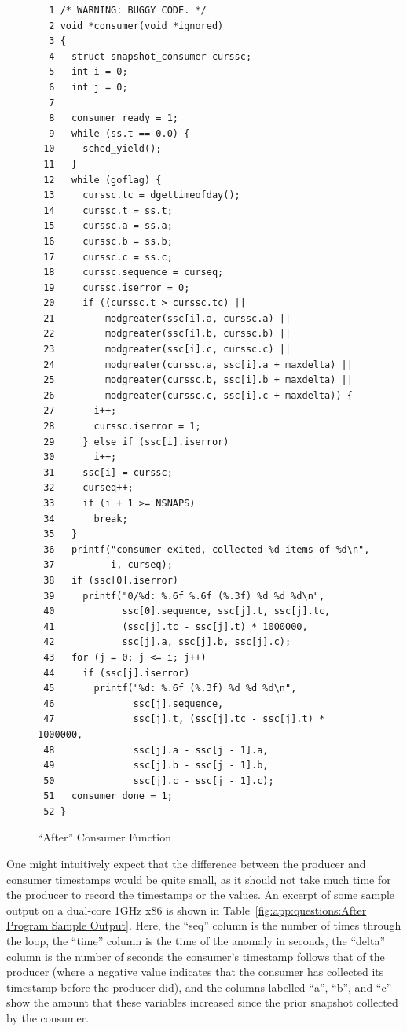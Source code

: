 \begin{figure}[htbp]
{ \scriptsize
\begin{verbatim}
  1 /* WARNING: BUGGY CODE. */
  2 void *consumer(void *ignored)
  3 {
  4   struct snapshot_consumer curssc;
  5   int i = 0;
  6   int j = 0;
  7 
  8   consumer_ready = 1;
  9   while (ss.t == 0.0) {
 10     sched_yield();
 11   }
 12   while (goflag) {
 13     curssc.tc = dgettimeofday();
 14     curssc.t = ss.t;
 15     curssc.a = ss.a;
 16     curssc.b = ss.b;
 17     curssc.c = ss.c;
 18     curssc.sequence = curseq;
 19     curssc.iserror = 0;
 20     if ((curssc.t > curssc.tc) ||
 21         modgreater(ssc[i].a, curssc.a) ||
 22         modgreater(ssc[i].b, curssc.b) ||
 23         modgreater(ssc[i].c, curssc.c) ||
 24         modgreater(curssc.a, ssc[i].a + maxdelta) ||
 25         modgreater(curssc.b, ssc[i].b + maxdelta) ||
 26         modgreater(curssc.c, ssc[i].c + maxdelta)) {
 27       i++;
 28       curssc.iserror = 1;
 29     } else if (ssc[i].iserror)
 30       i++;
 31     ssc[i] = curssc;
 32     curseq++;
 33     if (i + 1 >= NSNAPS)
 34       break;
 35   }
 36   printf("consumer exited, collected %d items of %d\n",
 37          i, curseq);
 38   if (ssc[0].iserror)
 39     printf("0/%d: %.6f %.6f (%.3f) %d %d %d\n",
 40            ssc[0].sequence, ssc[j].t, ssc[j].tc,
 41            (ssc[j].tc - ssc[j].t) * 1000000,
 42            ssc[j].a, ssc[j].b, ssc[j].c);
 43   for (j = 0; j <= i; j++)
 44     if (ssc[j].iserror)
 45       printf("%d: %.6f (%.3f) %d %d %d\n",
 46              ssc[j].sequence,
 47              ssc[j].t, (ssc[j].tc - ssc[j].t) * 1000000,
 48              ssc[j].a - ssc[j - 1].a,
 49              ssc[j].b - ssc[j - 1].b,
 50              ssc[j].c - ssc[j - 1].c);
 51   consumer_done = 1;
 52 }
\end{verbatim}
}
\caption{``After'' Consumer Function}
\label{fig:app:questions:After Consumer Function}
\end{figure}

 \QuickQuizEnd

One might intuitively expect that the difference between the producer
and consumer timestamps would be quite small, as it should not take
much time for the producer to record the timestamps or the values.
An excerpt of some sample output on a dual-core 1GHz x86 is shown in
Table~\ref{fig:app:questions:After Program Sample Output}.
Here, the ``seq'' column is the number of times through the loop,
the ``time'' column is the time of the anomaly in seconds, the ``delta''
column is the number of seconds the consumer's timestamp follows that
of the producer (where a negative value indicates that the consumer
has collected its timestamp before the producer did), and the
columns labelled ``a'', ``b'', and ``c'' show the amount that these
variables increased since the prior snapshot collected by the consumer.

